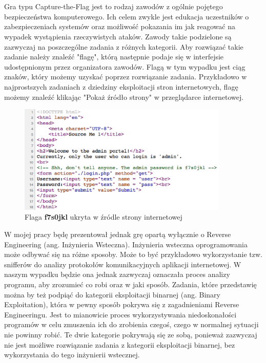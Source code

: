 \documentclass[polish,12pt]{aghthesis}
\author{Piotr Szczygieł}
\date{\the\year}
\begin{document}
\maketitle

\section{\SectionTitleProjectVision}
\label{sec:cel-wizja}

Gra typu Capture-the-Flag jest to rodzaj zawodów z ogólnie pojętego
bezpieczeństwa komputerowego. Ich celem zwykle jest edukacja uczestników
o zabezpieczeniach systemów oraz możliwość pokazania im jak reagować
na wypadek wystąpienia rzeczywistych ataków. Zawody takie podzielone są zazwyczaj
na poszczególne zadania z różnych kategorii. Aby rozwiązać takie zadanie należy
znaleźć "flagę", którą następnie podaje się w interfejsie udostępnionym przez
organizatora zawodów. Flagą w tym wypadku jest ciąg znaków, który możemy uzyskać
poprzez rozwiązanie zadania. Przykładowo w najprostszych zadaniach
z dziedziny eksploitacji stron internetowych, flagę możemy znaleźć klikając
"Pokaż źródło strony" w przeglądarce internetowej.

\begin{figure}[h]
    \centering
    \includegraphics[width=10cm]{flag_page_source}
    \caption{Flaga \textbf{f7s0jkl} ukryta w źródle strony internetowej}
    \label{fig:flag_page_source}
\end{figure}

W mojej pracy będę prezentował jednak grę opartą
wyłącznie o Reverse Engineering (ang. Inżynieria Wsteczna).
Inżynieria wsteczna oprogramowania może odbywać się na różne sposoby.
Może to być przykładowo wykorzystanie tzw. snifferów do analizy protokołów
komunikacyjnych aplikacji internetowej. W naszym wypadku będzie ona jednak
zazwyczaj oznaczała proces analizy programu, aby zrozumieć co robi
oraz w jaki sposób. Zadania, które przedstawię można by też podpiąć do kategorii
eksploitacji binarnej (ang. Binary Exploitation), która w pewny sposób pokrywa
się z zagadnieniami Reverse Engineeringu. Jest to mianowicie proces
wykorzystywania niedoskonałości programów w celu zmuszenia ich do zrobienia
czegoś, czego w normalnej sytuacji nie powinny robić. Te dwie kategorie pokrywają
się ze sobą, ponieważ zazwyczaj nie jest możliwe rozwiązanie zadania z kategorii
eksploitacji binarnej, bez wykorzystania do tego inżynierii wstecznej. \pagebreak
\end{document}

